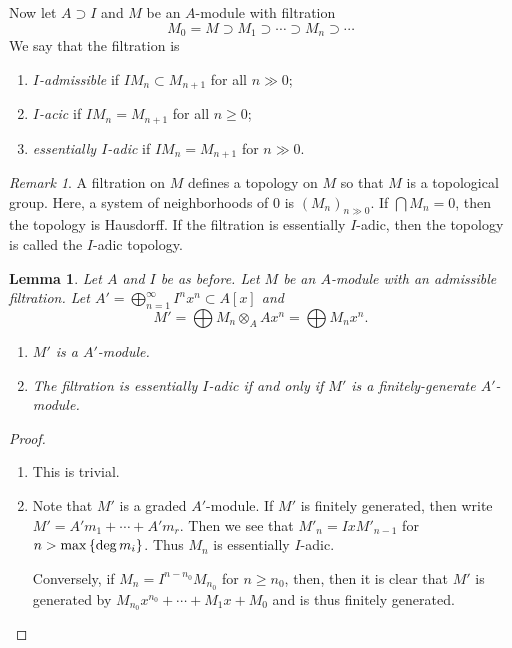 \documentclass[leqno, openany]{memoir}
\newtheorem{lem}[thm]{Lemma}
\theoremstyle{definition}
\theoremstyle{remark}
\newtheorem{rmk}[thm]{Remark}
\theoremstyle{plain}
\theoremstyle{definition}
\theoremstyle{remark}
\begin{document}
Now let $A \supset I$ and $M$ be an $A$-module with filtration \[ M_0 = M
    \supset M_1 \supset \cdots \supset M_n \supset \cdots \] We say that the
    filtration is \begin{enumerate} \item \textit{$I$-admissible} if $I M_n
        \subset M_{n+1}$ for all $n \gg 0$; \item \textit{$I$-acic} if $I M_n =
M_{n+1}$ for all $n \geq 0$; \item \textit{essentially $I$-adic} if $I M_n =
M_{n+1}$ for $n \gg 0$.  \end{enumerate}

\begin{rmk} A filtration on $M$ defines a topology on $M$ so that $M$ is a
    topological group. Here, a system of neighborhoods of $0$ is $(M_n)_{n \gg
    0}$. If $\bigcap M_n = 0$, then the topology is Hausdorff. If the
    filtration is essentially $I$-adic, then the topology is called the
    $I$-adic topology.  \end{rmk}

\begin{lem} Let $A$ and $I$ be as before. Let $M$ be an $A$-module with an
    admissible filtration. Let $A' = \bigoplus_{n=1}^{\infty} I^n x^n \subset
    A[x]$ and \[ M' = \bigoplus M_n \otimes_A Ax^n = \bigoplus M_n x^n. \]
    \begin{enumerate} \item $M'$ is a $A'$-module.  \item The filtration is
    essentially $I$-adic if and only if $M'$ is a finitely-generate
    $A'$-module.  \end{enumerate} \end{lem}

\begin{proof} \begin{enumerate} \item This is trivial.  \item Note that $M'$ is
    a graded $A'$-module. If $M'$ is finitely generated, then write $M' = A'
    m_1 + \cdots + A' m_r$. Then we see that $ M'_n = I x M'_{n-1}$ for $n >
    \max \qty{ \deg m_i }$. Thus $M_n$ is essentially $I$-adic.

            Conversely, if $M_n = I^{n - n_0} M_{n_0}$ for $n \geq n_0$, then,
    then it is clear that $M'$ is generated by $M_{n_0} x^{n_0} + \cdots + M_1
    x + M_0$ and is thus finitely generated. \qedhere \end{enumerate}
\end{proof}
\end{document}
